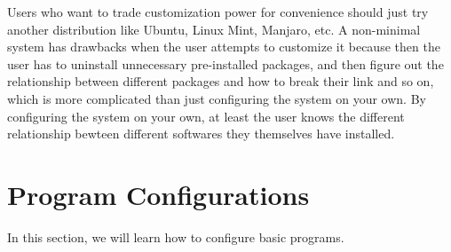 \documentclass[a4paper, 12pt]{report}
\begin{document}
\begin{center}
Users who want to trade customization power for convenience should just try another distribution like Ubuntu, Linux Mint, Manjaro, etc. A non-minimal system has drawbacks when the user attempts to customize it because then the user has to uninstall unnecessary pre-installed packages, and then figure out the relationship between different packages and how to break their link and so on, which is more complicated than just configuring the system on your own. By configuring the system on your own, at least the user knows the different relationship bewteen different softwares they themselves have installed.

\section{Program Configurations}

In this section, we will learn how to configure basic programs. 


\end{center}
\end{document}
